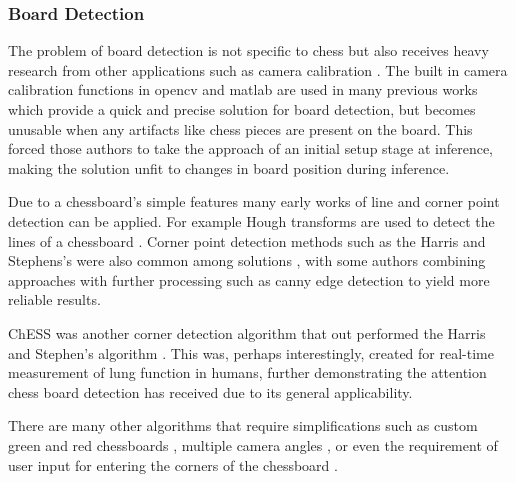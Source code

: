 \subsubsection{Board Detection}
The problem of board detection is not specific to chess but also receives heavy research from other applications such as camera calibration \cite{cameraCalibration}. 
The built in camera calibration functions in opencv \cite{opencv_library} and matlab \cite{MATLAB:2010} are used in many previous works \cite{Koray2016ACV, bowers_2014} which 
provide a quick and precise solution for board detection, but becomes unusable when any artifacts like chess pieces are present on the board.  
This forced those authors to take the approach of an initial setup stage at inference, making the solution unfit to changes in board position during inference. 

Due to a chessboard's simple features many early works of line and corner point detection can be applied.  For example Hough 
transforms are used to detect the lines of a chessboard \cite{CVChess, nusChessVision}.  Corner point detection methods such as the 
Harris and Stephens's \cite{} were also common among solutions \cite{}, with some authors combining approaches with further 
processing such as canny edge detection \cite{} to yield more reliable results.

ChESS was another corner detection algorithm that out performed the Harris and Stephen's algorithm \cite{}. This was, perhaps 
interestingly, created for real-time measurement of lung function in humans, further demonstrating the attention chess board
detection has received due to its general applicability.

There are many other algorithms that require simplifications such as custom green and red chessboards \cite{}, multiple camera angles \cite{}, 
or even the requirement of user input for entering the corners of the chessboard \cite{}.

